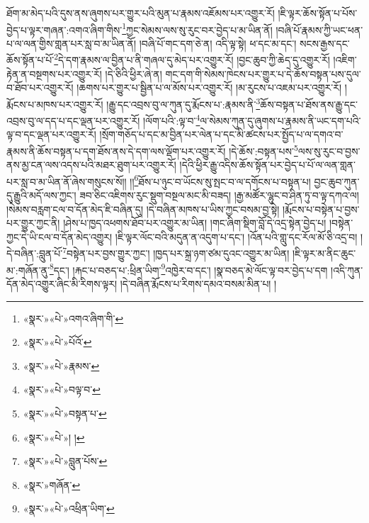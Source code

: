 ཐོག་མ་མེད་པའི་དུས་ནས་ཞུགས་པར་གྱུར་པའི་མུན་པ་རྣམས་འཇོམས་པར་འགྱུར་རོ། །ཇི་ལྟར་ཆོས་སྟོན་པ་པོས་བྱེད་པ་ལྟར་གཞན་:འགའ་ཞིག་གིས་\footnote{«སྣར་»«པེ་»འགའ་ཞིག་གི་}ཀྱང་སེམས་ལས་སུ་རུང་བར་བྱེད་པ་མ་ཡིན་ནོ། །བཞི་པོ་རྣམས་ཀྱི་ཡང་ཕན་པ་ལ་ལན་གྱིས་གླན་པར་སླ་བ་མ་ཡིན་ནོ། །བཞི་པོ་གང་དག་ཅེ་ན། འདི་ལྟ་སྟེ། ཕ་དང་མ་དང་། སངས་རྒྱས་དང་ཆོས་སྟོན་པ་པོ་\footnote{«སྣར་»«པེ་»པོའོ་}དེ་དག་རྣམས་ལ་བྱིན་པ་ནི་གཞལ་དུ་མེད་པར་འགྱུར་རོ། །བྱང་ཆུབ་ཀྱི་ཆེད་དུ་འགྱུར་རོ། །འཇིག་རྟེན་ན་བསྔགས་པར་འགྱུར་རོ། །དེ་ཅིའི་ཕྱིར་ཞེ་ན། གང་དག་གི་སེམས་ཁེངས་པར་གྱུར་པ་དེ་ཆོས་བསྟན་པས་དུལ་བ་ཐོབ་པར་འགྱུར་རོ། །ཆགས་པར་གྱུར་པ་སྦྱིན་པ་ལ་མོས་པར་འགྱུར་རོ། །མ་རུངས་པ་འཇམ་པར་འགྱུར་རོ། །རྨོངས་པ་མཁས་པར་འགྱུར་རོ། །རྒྱུ་དང་འབྲས་བུ་ལ་ཀུན་དུ་རྨོངས་པ་:རྣམས་ནི་\footnote{«སྣར་»«པེ་»རྣམས་}ཆོས་བསྟན་པ་ཐོས་ནས་རྒྱུ་དང་འབྲས་བུ་ལ་དད་པ་དང་ལྡན་པར་འགྱུར་རོ། །ལོག་པའི་:ལྟ་བ་\footnote{«སྣར་»«པེ་»བལྟ་བ་}ལ་སེམས་ཀུན་དུ་ཞུགས་པ་རྣམས་ནི་ཡང་དག་པའི་ལྟ་བ་དང་ལྡན་པར་འགྱུར་རོ། །སྲོག་གཅོད་པ་དང་མ་བྱིན་པར་ལེན་པ་དང་མི་ཚངས་པར་སྤྱོད་པ་ལ་དགའ་བ་རྣམས་ནི་ཆོས་བསྟན་པ་དག་ཐོས་ནས་དེ་དག་ལས་ལྡོག་པར་འགྱུར་རོ། །དེ་ཆོས་:བསྟན་པས་\footnote{«སྣར་»«པེ་»བསྟན་པ་}ལས་སུ་རུང་བ་བྱས་ནས་མྱ་ངན་ལས་འདས་པའི་མཐར་ཐུག་པར་འགྱུར་རོ། །དེའི་ཕྱིར་རྒྱུ་འདིས་ཆོས་སྟོན་པར་བྱེད་པ་པོ་ལ་ལན་གླན་པར་སླ་བ་མ་ཡིན་ནོ་ཞེས་གསུངས་སོ།། །།\footnote{«སྣར་»«པེ་»། །}ཐོས་པ་ཉུང་བ་ཡོངས་སུ་སྤང་བ་ལ་དགོངས་པ་བསྟན་པ། བྱང་ཆུབ་ཀུན་དུ་རྒྱུའི་མདོ་ལས་ཀྱང་། ཟབ་ཅིང་འཇིགས་རུང་སྡུག་བསྔལ་མང་མི་བཟད། །རྒྱ་མཚོར་ལྷུང་བ་ཤིན་ཏུ་བ་ལྟ་དཀའ་ལ། །སེམས་བརླག་ངལ་བ་དོན་མེད་ཇི་བཞིན་དུ། །དེ་བཞིན་མཁས་པ་ཡིས་ཀྱང་བསམ་བྱ་སྟེ། །རྨོངས་པ་བསྟེན་པ་བྱས་པར་གྱུར་ཀྱང་ནི། །ཤེས་པ་ཁྱད་འཕགས་ཐོབ་པར་འགྱུར་མ་ཡིན། །གང་ཞིག་སྡིག་བློ་དེ་འདྲ་སྟེན་བྱེད་པ། །བསྟེན་ཀྱང་དེ་ཡི་ངལ་བ་དོན་མེད་འགྱུར། །ཇི་ལྟར་ལོང་བའི་མདུན་ན་འདུག་པ་དང་། །འོན་པའི་གླུ་དང་རོལ་མོ་ཅི་འདྲ་བ། །དེ་བཞིན་:བླུན་པོ་\footnote{«སྣར་»«པེ་»བླུན་པོས་}བསྟེན་པར་བྱས་གྱུར་ཀྱང་། །ཁྱད་པར་སྐྲ་ཉག་ཙམ་དུའང་འགྱུར་མ་ཡིན། །ཇི་ལྟར་མ་ནིང་ཆུང་མ་:གཞོན་ནུ་\footnote{«སྣར་»གཞོན་}དང་། །རྐང་པ་བཅད་པ་:ཕྲིན་ཡིག་\footnote{«སྣར་»«པེ་»འཕྲིན་ཡིག་}འཁྱེར་བ་དང་། །སྣ་བཅད་མེ་ལོང་ལྟ་བར་བྱེད་པ་དག །འདི་ཀུན་དོན་མེད་འགྱུར་ཞིང་མི་རིགས་ལྟར། །དེ་བཞིན་རྨོངས་པ་རིགས་དམའ་བསམ་མིན་པ། །
